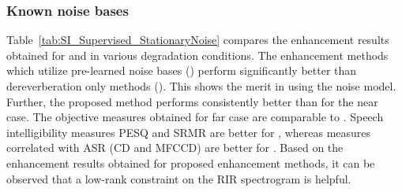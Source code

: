 \subsubsection{Known noise bases}
\label{sec:known_noise_cond}
Table~\ref{tab:SI_Supervised_StationaryNoise} compares the enhancement results obtained for  and  in various degradation conditions. The enhancement methods which utilize pre-learned noise bases () perform significantly better than dereverberation only methods (). This shows the merit in using the noise model. Further, the proposed method  performs consistently better than  for the near case. The objective measures obtained  for far case are comparable to . Speech intelligibility measures PESQ and SRMR are better for , whereas measures correlated with ASR (CD and MFCCD) are better for . Based on the enhancement results obtained for proposed enhancement methods, it can be observed that a low-rank constraint on the RIR spectrogram is helpful.

